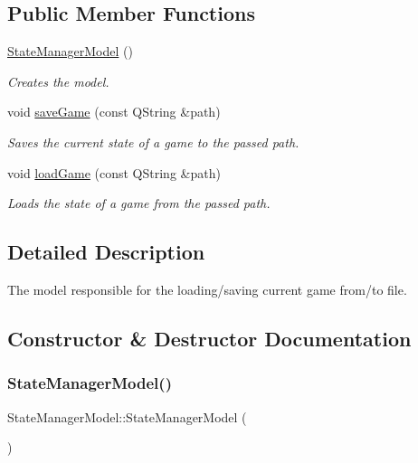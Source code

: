 \subsection*{Public Member Functions}
\begin{DoxyCompactItemize}
\item 
\mbox{\hyperlink{class_state_manager_model_a79fdf627c06b835bbe4c457366f66524}{State\+Manager\+Model}} ()
\begin{DoxyCompactList}\small\item\em Creates the model. \end{DoxyCompactList}\item 
void \mbox{\hyperlink{class_state_manager_model_a57883b92890873f23537e78c1bf6f2de}{save\+Game}} (const Q\+String \&path)
\begin{DoxyCompactList}\small\item\em Saves the current state of a game to the passed path. \end{DoxyCompactList}\item 
void \mbox{\hyperlink{class_state_manager_model_abf3febd681c98f8522bd52944e720618}{load\+Game}} (const Q\+String \&path)
\begin{DoxyCompactList}\small\item\em Loads the state of a game from the passed path. \end{DoxyCompactList}\end{DoxyCompactItemize}


\subsection{Detailed Description}
The model responsible for the loading/saving current game from/to file. 



\subsection{Constructor \& Destructor Documentation}
\mbox{\label{class_state_manager_model_a79fdf627c06b835bbe4c457366f66524}} 
\subsubsection{\texorpdfstring{StateManagerModel()}{StateManagerModel()}}
{\footnotesize\ttfamily State\+Manager\+Model\+::\+State\+Manager\+Model (\begin{DoxyParamCaption}{ }\end{DoxyParamCaption})}



